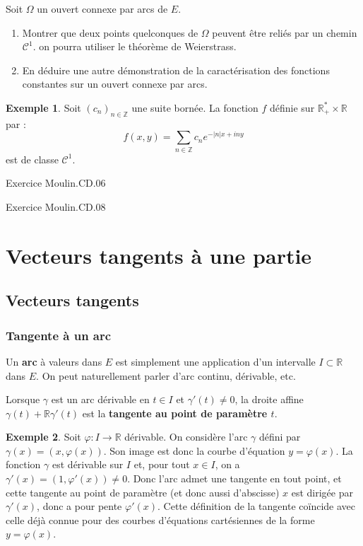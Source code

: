 \documentclass[french]{article}
\newcommand{\Z}{\mathbb{Z}}
\newcommand{\R}{\mathbb{R}}
\newcommand{\st}{^*}
\theoremstyle{plain}
\theoremstyle{definition}
\newtheorem*{ex}{Exemple}
\theoremstyle{remark}
\begin{document}
\begin{exo}[$\star$]
	Soit $\Omega$ un ouvert connexe par arcs de $E$.
	\begin{enumerate}
		\item Montrer que deux points quelconques de $\Omega$ peuvent être reliés par un chemin $\mathcal{C}^1$. on pourra utiliser le théorème de Weierstrass.
		\item En déduire une autre démonstration de la caractérisation des fonctions constantes sur un ouvert connexe par arcs.
	\end{enumerate}
\end{exo}

\begin{ex}
	Soit $(c_n)_{n\in\Z}$ une suite bornée. La fonction $f$ définie sur $\R_+\st\times\R$ par :
	$$f(x,y)=\sum_{n\in\Z}c_ne^{-\lvert n\rvert x+iny}$$ est de classe $\mathcal{C}^1$.
\end{ex}

Exercice Moulin.CD.06


Exercice Moulin.CD.08

\section{Vecteurs tangents à une partie}

\subsection{Vecteurs tangents}

\subsubsection*{Tangente à un arc}

Un \textbf{arc} à valeurs dans $E$ est simplement une application d'un intervalle $I\subset\R$ dans $E$. On peut naturellement parler d'arc continu, dérivable, etc.

Lorsque $\gamma$ est un arc dérivable en $t\in I$ et $\gamma'(t)\ne0$, la droite affine $\gamma(t)+\R\gamma'(t)$ est la \textbf{tangente au point de paramètre $t$}.

\begin{ex}
	Soit $\varphi:I\to\R$ dérivable. On considère l'arc $\gamma$ défini par $\gamma(x)=(x,\varphi(x))$. Son image est donc la courbe d'équation $y=\varphi(x)$. La fonction $\gamma$ est dérivable sur $I$ et, pour tout $x\in I$, on a $\gamma'(x)=(1,\varphi'(x))\ne0$. Donc l'arc admet une tangente en tout point, et cette tangente au point de paramètre (et donc aussi d'abscisse) $x$ est dirigée par $\gamma'(x)$, donc a pour pente $\varphi'(x)$. Cette définition de la tangente coïncide avec celle déjà connue pour des courbes d'équations cartésiennes de la forme $y=\varphi(x)$.
\end{ex}
\end{document}

